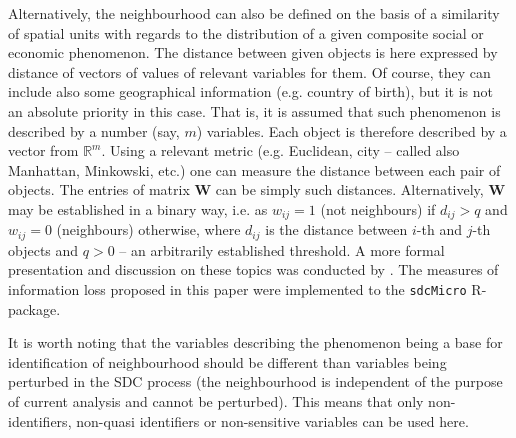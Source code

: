 Alternatively, the neighbourhood can also be defined on the basis of a similarity of spatial units with regards to the distribution of a given composite social or economic phenomenon. The distance between given objects is here expressed by distance of vectors of values of relevant variables for them. Of course, they can include also some geographical information (e.g. country of birth), but it is not an absolute priority in this case. That is, it is assumed that such phenomenon is described by a number (say, $m$) variables. Each object is therefore described by a vector from $\mathbb{R}^m$. Using a relevant metric (e.g. Euclidean, city -- called also Manhattan, Minkowski, etc.) one can measure the distance between each pair of objects. The entries of matrix $\mathbf{W}$ can be simply such distances. Alternatively, $\mathbf{W}$ may be established in a binary way, i.e. as $w_{ij}=1$ (not neighbours) if $d_{ij}>q$ and $w_{ij}=0$ (neighbours) otherwise, where $d_{ij}$ is the distance between $i$-th and $j$-th objects and $q>0$ -- an arbitrarily established threshold. A more formal presentation and discussion on these topics was conducted by \cite{Mlodak2013}. The measures of information loss proposed in this paper were implemented to the \texttt{sdcMicro} R-package.   

It is worth noting that the variables describing the phenomenon being a base for identification of neighbourhood should be different than variables being perturbed in the SDC process (the neighbourhood is independent of the purpose of current analysis and cannot be perturbed). This means that only non-identifiers, non-quasi identifiers or non-sensitive variables can be used here.\\

